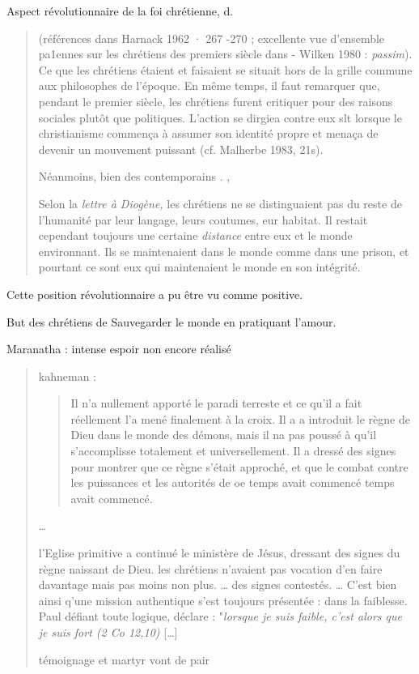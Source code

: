Aspect révolutionnaire de la foi chrétienne, d. 
\begin{quote}
(références dans
    Harnack 1962 · 267 -270 ; excellente vue d'ensemble
pa1ennes sur les chrétiens   des premiers siècle dans - Wilken 1980 :
\textit{passim}). Ce que les chrétiens étaient et faisaient se situait hors de la grille commune aux philosophes de l'époque. En même temps, il faut 
remarquer que, pendant le premier siècle, les chrétiens furent critiquer 
pour des raisons sociales plutôt que politiques. L'action se dirgiea contre eux slt lorsque le christianisme commença à assumer son identité propre et menaça de devenir un mouvement puissant (cf. Malherbe 1983, 21s).

Néanmoins, bien des contemporains . ,
 
 
 Selon la \textit{lettre à Diogène, } les chrétiens ne se distinguaient pas du reste de l'humanité par leur langage, leurs coutumes, eur habitat. Il restait cependant toujours une certaine \textit{distance} entre eux et le monde environnant. Ils se maintenaient dans le monde comme dans une prison, et pourtant ce sont eux qui maintenaient le monde en son intégrité.
\end{quote}

Cette position révolutionnaire a pu être vu comme positive. 
\begin{Synthesis}
But des chrétiens de Sauvegarder le monde en pratiquant l'amour. 

Maranatha : intense espoir non encore réalisé
\end{Synthesis}

\begin{quote} 
    kahneman : 
    \begin{quote}
    
    Il n'a nullement apporté le paradi terreste et ce qu'il a fait réellement l'a
mené finalement à la croix. Il a a introduit le règne de Dieu dans le monde 
des démons, mais il na pas poussé à qu'il s'accomplisse totalement et 
universellement. Il a dressé des signes pour montrer que ce règne s'était
approché, et que le combat contre les puissances et les autorités de oe
 temps avait commencé
temps avait commencé.
\end{quote}
 
 \ldots
 
 l'Eglise primitive a continué le ministère de Jésus, dressant des signes du règne naissant de Dieu. les chrétiens n'avaient pas vocation d'en faire davantage mais pas moins non plus.
\ldots
des signes contestés. \ldots
C'est bien ainsi q'une mission authentique s'est toujours présentée : dans la faiblesse. Paul défiant toute logique, déclare : "\textit{lorsque je suis faible, c'est alors que je suis fort (2 Co 12,10)}
[\ldots]

témoignage et martyr vont de pair
\end{quote}


